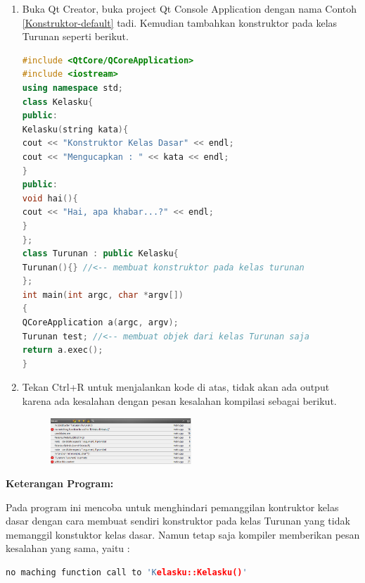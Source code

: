 \begin{enumerate}

\item
  Buka Qt Creator, buka project Qt Console Application dengan nama
  Contoh \ref{Konstruktor-default} tadi. Kemudian tambahkan konstruktor pada kelas Turunan
  seperti berikut.

\begin{lstlisting}[language=c++, caption=Konstruktor kelas turunan harus memanggil salah satu konstruktor kelas dasar, label=Konstruktor-kelas-turunan-harus-memanggil-salah-satu-konstruktor-kelas-dasar]
#include <QtCore/QCoreApplication>
#include <iostream>
using namespace std;
class Kelasku{
public:
Kelasku(string kata){
cout << "Konstruktor Kelas Dasar" << endl;
cout << "Mengucapkan : " << kata << endl;
}
public:
void hai(){
cout << "Hai, apa khabar...?" << endl;
}
};
class Turunan : public Kelasku{
Turunan(){} //<-- membuat konstruktor pada kelas turunan
};
int main(int argc, char *argv[])
{
QCoreApplication a(argc, argv);
Turunan test; //<-- membuat objek dari kelas Turunan saja
return a.exec();
}
\end{lstlisting}
\item
  Tekan Ctrl+R untuk menjalankan kode di atas, tidak akan ada output
  karena ada kesalahan dengan pesan kesalahan kompilasi sebagai berikut.
  
  \begin{figure}[htbp]
  	\centering
  	\includegraphics[width=0.5\textwidth]{images/capture7-3.png}
  	
  \end{figure}
\end{enumerate}



\textbf{Keterangan Program:}

Pada program ini mencoba untuk menghindari pemanggilan kontruktor kelas
dasar dengan cara membuat sendiri konstruktor pada kelas Turunan yang
tidak memanggil konstuktor kelas dasar. Namun tetap saja kompiler
memberikan pesan kesalahan yang sama, yaitu :

\begin{lstlisting}[language=c++, numbers=none]
no maching function call to 'Kelasku::Kelasku()' 
\end{lstlisting}

